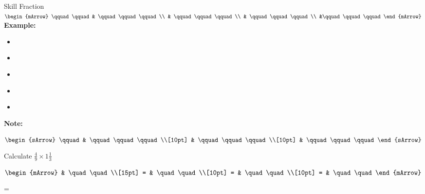 \begin{boxSkill}{Skill \thenskill \quad Fraction }
    \noindent%
	 $\begin{mArrow}
        \qquad \qquad &    \qquad\qquad\qquad          \\
                      & \qquad\qquad\qquad \\
			          & \qquad\qquad\qquad  \\
			          &\qquad\qquad\qquad
 	 \end{mArrow}$\\[0.5cm]
	 

	\textbf{Example:}
	\begin{itemize}[leftmargin=0.8cm]
	     \item[] $\qquad\qquad\qquad    $
	     \item[] $\qquad\qquad\qquad     $
	     \item[] $\qquad\qquad\qquad      $ 
	     \item[] $\qquad\qquad\qquad    $
	     \item[] $\qquad\qquad\qquad  $	 
	\end{itemize}
	
	\tcbline
	
    \textbf{Note:}\\[0.6cm]
	\begin{warningEnv}
	    $\begin{sArrow}
	        \qquad   & \qquad\qquad\qquad \\[10pt]
	  	             & \qquad\qquad\qquad                                                                        \\[10pt] 
                     & \qquad\qquad\qquad 				   
		 \end{sArrow}$		   
    \end{warningEnv}
\end{boxSkill}

\clearpage\noindent%
\begin{mtask}
   \task \begin{exercise} Calculate $ \frac{4}{9} \times 1 \frac{1}{3} $
           \begin{envSolution}
             $\begin{mArrow} 
			       & \quad \quad              \\[15pt]
                 = & \quad \quad              \\[10pt]
		   		 = & \quad \quad              \\[10pt]
				 = & \quad \quad 
              \end{mArrow}$
            \begin{shortsolution}  
			     =$ \quad \quad \quad \quad$
			\end{shortsolution}				 
           \end{envSolution}
         \end{exercise}
\end{mtask}


